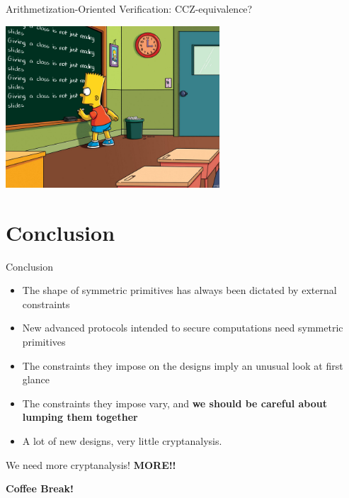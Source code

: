 \documentclass[presentation,aspectratio=1610]{beamer}
\begin{document}
\begin{frame}{Arithmetization-Oriented Verification: CCZ-equivalence?}
  \vfill

  \begin{center}
    \includegraphics[width=8cm]{./figures/simpsons}
  \end{center}
  
  \vfill
\end{frame}



\section{Conclusion}



\begin{frame}{Conclusion}
  ~
  {
    \begin{itemize}
    \item The shape of symmetric primitives has always been dictated by \alert{external constraints} \pause
    \item New \alert{advanced protocols} intended to secure \alert{computations} need symmetric primitives \pause
    \item The constraints they impose on the designs imply an \alert{unusual look at first glance} \pause
    \item The constraints they impose \alert{vary}, and \textbf{we should be careful about lumping them together} \pause
      
    \item A lot of new designs, very little cryptanalysis.
    \end{itemize}
  }
  \pause\vspace{1cm}
  
  \begin{center}
    \large{\alert{We need more cryptanalysis! \pause \textbf{MORE!!}}}

    \pause\vspace{1cm}
    \textbf{Coffee Break!}
  \end{center}
\end{frame}

\appendix



\end{document}
